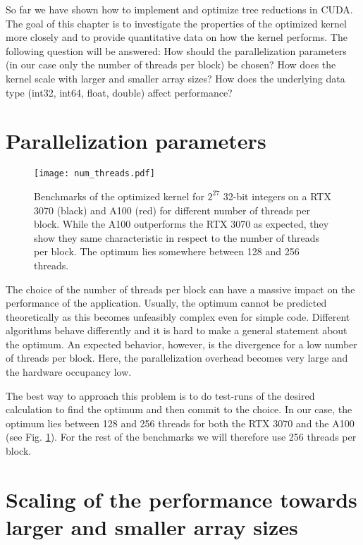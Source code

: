 So far we have shown how to implement and optimize tree reductions in CUDA.
The goal of this chapter is to investigate the properties of the optimized kernel more closely and to provide quantitative data on how the kernel performs. 
The following question will be answered:
How should the parallelization parameters (in our case only the number of threads per block) be chosen?
How does the kernel scale with larger and smaller array sizes?
How does the underlying data type (int32, int64, float, double) affect performance?


\section{Parallelization parameters}

\begin{figure}
    \centering
    \texttt{[image: num\_threads.pdf]}
    \caption{
        Benchmarks of the optimized kernel for \( 2^{27} \) 32-bit integers on a RTX 3070 (black) and A100 (red) for different number of threads per block.
        While the A100 outperforms the RTX 3070 as expected, they show they same characteristic in respect to the number of threads per block.
        The optimum lies somewhere between 128 and 256 threads.
    } \label{fig_num_threads}
\end{figure}

The choice of the number of threads per block can have a massive impact on the performance of the application.
Usually, the optimum cannot be predicted theoretically as this becomes unfeasibly complex even for simple code.
Different algorithms behave differently and it is hard to make a general statement about the optimum.
An expected behavior, however, is the divergence for a low number of threads per block.
Here, the parallelization overhead becomes very large and the hardware occupancy low.

The best way to approach this problem is to do test-runs of the desired calculation to find the optimum and then commit to the choice.
In our case, the optimum lies between 128 and 256 threads for both the RTX 3070 and the A100 (see Fig. \ref{fig_num_threads}).
For the rest of the benchmarks we will therefore use 256 threads per block.

\section{Scaling of the performance towards larger and smaller array sizes}

